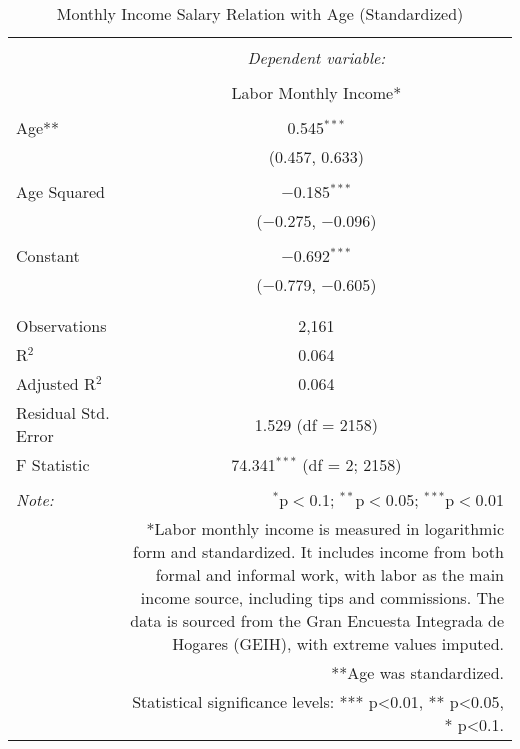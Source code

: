 
\begin{table}[!htbp] \centering 
  \caption{Monthly Income Salary Relation with Age (Standardized)} 
  \label{} 
\begin{tabular}{@{\extracolsep{5pt}}lc} 
\\[-1.8ex]\hline 
\hline \\[-1.8ex] 
 & \multicolumn{1}{c}{\textit{Dependent variable:}} \\ 
\cline{2-2} 
\\[-1.8ex] & Labor Monthly Income* \\ 
\hline \\[-1.8ex] 
 Age** & 0.545$^{***}$ \\ 
  & (0.457, 0.633) \\ 
  & \\ 
 Age Squared & $-$0.185$^{***}$ \\ 
  & ($-$0.275, $-$0.096) \\ 
  & \\ 
 Constant & $-$0.692$^{***}$ \\ 
  & ($-$0.779, $-$0.605) \\ 
  & \\ 
\hline \\[-1.8ex] 
Observations & 2,161 \\ 
R$^{2}$ & 0.064 \\ 
Adjusted R$^{2}$ & 0.064 \\ 
Residual Std. Error & 1.529 (df = 2158) \\ 
F Statistic & 74.341$^{***}$ (df = 2; 2158) \\ 
\hline 
\hline \\[-1.8ex] 
\textit{Note:}  & \multicolumn{1}{r}{$^{*}$p$<$0.1; $^{**}$p$<$0.05; $^{***}$p$<$0.01} \\ 
 & \multicolumn{1}{r}{*Labor monthly income is measured in logarithmic form and standardized. It includes income from both formal and informal work, with labor as the main income source, including tips and commissions. The data is sourced from the Gran Encuesta Integrada de Hogares (GEIH), with extreme values imputed.} \\ 
 & \multicolumn{1}{r}{**Age was standardized.} \\ 
 & \multicolumn{1}{r}{Statistical significance levels: *** p<0.01, ** p<0.05, * p<0.1.} \\ 
\end{tabular} 
\end{table} 
